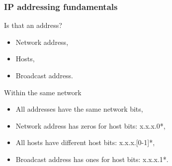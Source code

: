   \begin{frame}
    \frametitle{IP addressing fundamentals}
    \begin{block}{Is that an address?}
      \begin{itemize}
        \item Network address,
        \item Hosts,
        \item Broadcast address.
      \end{itemize}
    \end{block}
    \begin{block}{Within the same network}
      \begin{itemize}
        \item All addresses have the same {\color{ForestGreen}network} bits,
        \item Network address has zeros for {\color{blue}host} bits: {\color{ForestGreen}x.x.x}.{\color{blue}0*},
        \item All {\color{blue}hosts} have different {\color{blue}host} bits: {\color{ForestGreen}x.x.x}.{\color{blue}[0-1]*},
        \item Broadcast address has ones for {\color{blue}host} bits: {\color{ForestGreen}x.x.x}.{\color{blue}1*}.
      \end{itemize}
    \end{block}
  \end{frame}

